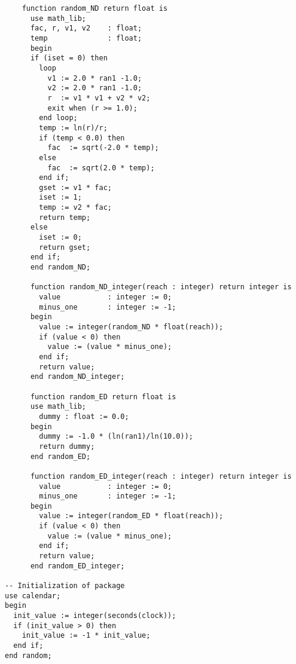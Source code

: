 \begin{verbatim}
    function random_ND return float is
      use math_lib;
      fac, r, v1, v2    : float;
      temp              : float;
      begin
      if (iset = 0) then
        loop
          v1 := 2.0 * ran1 -1.0;
          v2 := 2.0 * ran1 -1.0;
          r  := v1 * v1 + v2 * v2;
          exit when (r >= 1.0);
        end loop;
        temp := ln(r)/r;
        if (temp < 0.0) then
          fac  := sqrt(-2.0 * temp);
        else
          fac  := sqrt(2.0 * temp);
        end if;
        gset := v1 * fac;
        iset := 1;
        temp := v2 * fac;
        return temp;
      else
        iset := 0;
        return gset;
      end if;
      end random_ND;

      function random_ND_integer(reach : integer) return integer is
        value           : integer := 0;
        minus_one       : integer := -1;
      begin
        value := integer(random_ND * float(reach));
        if (value < 0) then
          value := (value * minus_one);
        end if;
        return value;
      end random_ND_integer;

      function random_ED return float is
      use math_lib;
        dummy : float := 0.0;
      begin
        dummy := -1.0 * (ln(ran1)/ln(10.0));
        return dummy;
      end random_ED;

      function random_ED_integer(reach : integer) return integer is
        value           : integer := 0;
        minus_one       : integer := -1;
      begin
        value := integer(random_ED * float(reach)); 
        if (value < 0) then
          value := (value * minus_one);
        end if;
        return value;
      end random_ED_integer;

-- Initialization of package
use calendar;
begin
  init_value := integer(seconds(clock));
  if (init_value > 0) then
    init_value := -1 * init_value;
  end if;
end random;
\end{verbatim}

